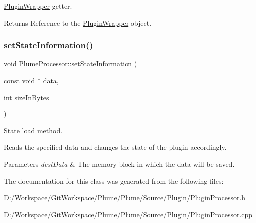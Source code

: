 \mbox{\hyperlink{class_plugin_wrapper}{Plugin\+Wrapper}} getter. 

\begin{DoxyReturn}{Returns}
Reference to the \mbox{\hyperlink{class_plugin_wrapper}{Plugin\+Wrapper}} object. 
\end{DoxyReturn}
\mbox{\label{class_plume_processor_aa7ab9da73c37f6db69ea6c7e1e4a0211}} 
\subsubsection{\texorpdfstring{set\+State\+Information()}{setStateInformation()}}
{\footnotesize\ttfamily void Plume\+Processor\+::set\+State\+Information (\begin{DoxyParamCaption}\item[{const void $\ast$}]{data,  }\item[{int}]{size\+In\+Bytes }\end{DoxyParamCaption})\hspace{0.3cm}{\ttfamily [override]}}



State load method. 

Reads the specified data and changes the state of the plugin accordingly.


\begin{DoxyParams}{Parameters}
{\em dest\+Data} & The memory block in which the data will be saved. \\
\hline
\end{DoxyParams}


The documentation for this class was generated from the following files\+:\begin{DoxyCompactItemize}
\item 
D\+:/\+Workspace/\+Git\+Workspace/\+Plume/\+Plume/\+Source/\+Plugin/Plugin\+Processor.\+h\item 
D\+:/\+Workspace/\+Git\+Workspace/\+Plume/\+Plume/\+Source/\+Plugin/Plugin\+Processor.\+cpp\end{DoxyCompactItemize}
